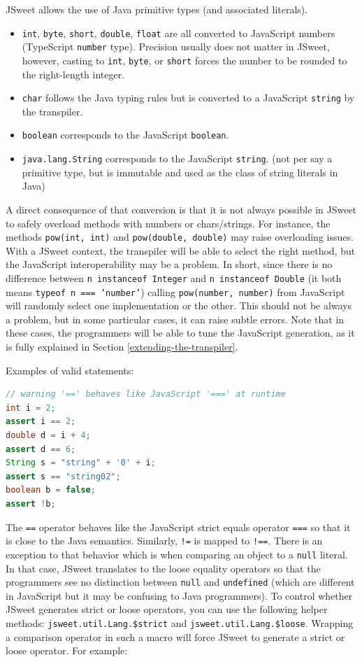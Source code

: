 \documentclass[a4paper]{report}
\begin{document}
JSweet allows the use of Java primitive types (and associated literals).

\begin{itemize}
\item \texttt{int}, \texttt{byte}, \texttt{short}, \texttt{double}, \texttt{float} are all converted to JavaScript numbers (TypeScript \texttt{number} type). Precision usually does not matter in JSweet, however, casting to \texttt{int}, \texttt{byte}, or \texttt{short} forces the number to be rounded to the right-length integer.
\item \texttt{char} follows the Java typing rules but is converted to a JavaScript \texttt{string} by the transpiler.
\item \texttt{boolean} corresponds to the JavaScript \texttt{boolean}.
\item \texttt{java.lang.String} corresponds to the JavaScript \texttt{string}. (not per say a primitive type, but is immutable and used as the class of string literals in Java)
\end{itemize}

A direct consequence of that conversion is that it is not always possible in JSweet to safely overload methods with numbers or chars/strings. For instance, the methods \texttt{pow(int, int)} and \texttt{pow(double, double)} may raise overloading issues. With a JSweet context, the transpiler will be able to select the right method, but the JavaScript interoperability may be a problem. In short, since there is no difference between \texttt{n instanceof Integer} and \texttt{n instanceof Double} (it both means \texttt{typeof n === 'number'}) calling \texttt{pow(number, number)} from JavaScript will randomly select one implementation or the other. This should not be always a problem, but in some particular cases, it can raise subtle errors. Note that in these cases, the programmers will be able to tune the JavaScript generation, as it is fully explained in Section \ref{extending-the-transpiler}.

\noindent
Examples of valid statements:

\begin{lstlisting}[language=Java]
// warning '==' behaves like JavaScript '===' at runtime
int i = 2;
assert i == 2;
double d = i + 4;
assert d == 6;
String s = "string" + '0' + i;
assert s == "string02";
boolean b = false;
assert !b;
\end{lstlisting}

The \texttt{==} operator behaves like the JavaScript strict equals operator \texttt{===} so that it is close to the Java semantics. Similarly, \texttt{!=} is mapped to \texttt{!==}. There is an exception to that behavior which is when comparing an object to a \texttt{null} literal. In that case, JSweet translates to the loose equality operators so that the programmers see no distinction between \texttt{null} and \texttt{undefined} (which are different in JavaScript but it may be confusing to Java programmers). To control whether JSweet generates strict or loose operators, you can use the following helper methods: \texttt{jsweet.\-util.\-Lang.\-\$strict} and \texttt{jsweet.\-util.\-Lang.\-\$loose}. Wrapping a comparison operator in such a macro will force JSweet to generate a strict or loose operator. For example:
\end{document}
